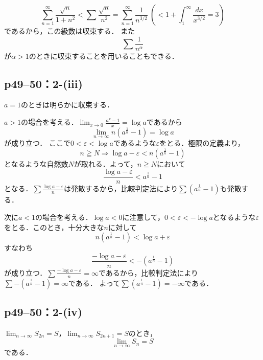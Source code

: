 \documentclass[a4paper,10pt,fleqn]{ltjsarticle}
\begin{document}
\begin{screen}
    \[
        \sum ^{\infty}_{n=1}\frac{\sqrt{n}}{1+n^2}<\sum \frac{\sqrt{n}}{n^2}=\sum^{\infty}_{n=1}\frac{1}{n^{3/2}}~\left(<1+\int^{\infty}_{1}\frac{dx}{x^{3/2}}=3\right)
    \]
    であるから，この級数は収束する．
    また
    \[
        \sum \frac{1}{n^\alpha}
    \]
    が$\alpha >1$のときに収束することを用いることもできる．
\end{screen}


\subsection*{p49--50：2-(iii)}

\begin{screen}
    $a=1$のときは明らかに収束する．

    $a>1$の場合を考える．$\lim_{x \to 0} \frac{a^x-1}{x} = \log a$であるから
    \[
        \lim_{n \to \infty} n(a^{\frac{1}{n}}-1) = \log a
    \]
    が成り立つ．
    ここで$0 < \varepsilon <\log a$であるような$\varepsilon$をとる．極限の定義より，
    \[
        n \geqq N \Longrightarrow \log a - \varepsilon < n (a^\frac{1}{n}-1)
    \]
    となるような自然数$N$が取れる．よって，$n \geqq N$において
    \[
        \frac{\log a - \varepsilon}{n} < a^\frac{1}{n}-1
    \]
    となる．$\sum \frac{\log a - \varepsilon}{n}$は発散するから，比較判定法により$\sum (a^{\frac{1}{n}}-1)$も発散する．

    次に$ a<1$の場合を考える．$\log a <0$に注意して，$0 < \varepsilon <-\log a $となるような$\varepsilon$をとる．このとき，十分大きな$n$に対して
    \[
        n (a^\frac{1}{n}-1) < \log a + \varepsilon
    \]
    すなわち
    \[
        \frac{-\log a - \varepsilon}{n} < -(a^\frac{1}{n}-1)
    \]
    が成り立つ．$\sum \frac{-\log a - \varepsilon}{n}=\infty$であるから，比較判定法により$\sum -(a^{\frac{1}{n}}-1)=\infty$である．
    よって$\sum (a^{\frac{1}{n}}-1)=-\infty$である．
\end{screen}


\subsection*{p49--50：2-(iv)}


$\lim_{n \to \infty} S_{2n}=S$，$\lim_{n \to \infty} S_{2n+1}=S$のとき，
\[
    \lim_{n \to \infty} S_n = S
\]
である．
\end{document}
